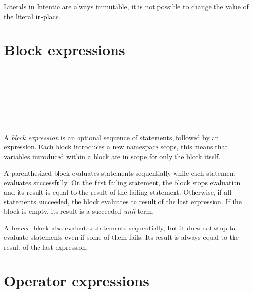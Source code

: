 Literals in Intentio are always immutable, it is not possible to change the value of the literal in-place.

\section{Block expressions}

\begin{bnf}
   \eq {} \\
  \\
   \eq \term{\{} \  \ \term{\}} \\
   \eq \term{(} \  \ \term{)} \\
  \\
   \eq {} \  \ \gtry{\term{;}}
\end{bnf}

A \emph{block expression} is an optional sequence of statements, followed by an expression. Each block introduces a new namespace scope, this means that variables introduced within a block are in scope for only the block itself.

A parenthesized block evaluates statements sequentially while each statement evaluates successfully. On the first failing statement, the block stops evaluation and its result is equal to the result of the failing statement. Otherwise, if all statements succeeded, the block evaluates to result of the last expression. If the block is empty, its result is a succeeded \emph{unit} term.

A braced block also evaluates statements sequentially, but it does not stop to evaluate statements even if some of them fails. Its result is always equal to the result of the last expression.
\section{Operator expressions}


